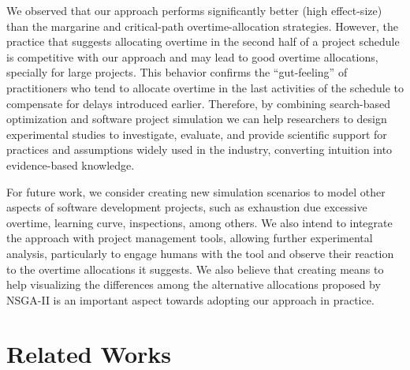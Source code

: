 \documentclass[conference]{IEEEtran}
\begin{document}
We observed that our approach performs significantly better (high effect-size) than the margarine and critical-path overtime-allocation strategies. However, the practice that suggests allocating overtime in the second half of a project schedule is competitive with our approach and may lead to good overtime allocations, specially for large projects. This behavior confirms the “gut-feeling” of practitioners who tend to allocate overtime in the last activities of the schedule to compensate for delays introduced earlier. Therefore, by combining search-based optimization and software project simulation we can help researchers to design experimental studies to investigate, evaluate, and provide scientific support for practices and assumptions widely used in the industry, converting intuition into evidence-based knowledge. 

For future work, we consider creating new simulation scenarios to model other aspects of software development projects, such as exhaustion due excessive overtime, learning curve, inspections, among others. We also intend to integrate the approach with project management tools, allowing further experimental analysis, particularly to engage humans with the tool and observe their reaction to the overtime allocations it suggests. We also believe that creating means to help visualizing the differences among the alternative allocations proposed by NSGA-II is an important aspect towards adopting our approach in practice.



\section{Related Works}
\end{document}
